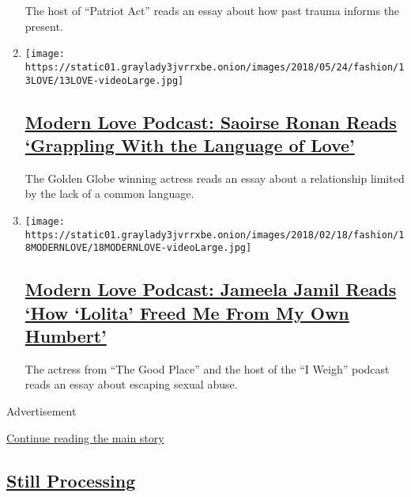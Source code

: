 \begin{enumerate}
  The host of ``Patriot Act'' reads an essay about how past trauma
  informs the present.
\item
  \texttt{[image: https://static01.graylady3jvrrxbe.onion/images/2018/05/24/fashion/13LOVE/13LOVE-videoLarge.jpg]}

  \hypertarget{modern-love-podcast-saoirse-ronan-reads-grappling-with-the-language-of-love}{%
  \subsection{\texorpdfstring{\href{/2020/05/27/style/modern-love-podcast-saoirse-ronan.html}{Modern
  Love Podcast: Saoirse Ronan Reads `Grappling With the Language of
  Love'}}{Modern Love Podcast: Saoirse Ronan Reads `Grappling With the Language of Love'}}\label{modern-love-podcast-saoirse-ronan-reads-grappling-with-the-language-of-love}}

  The Golden Globe winning actress reads an essay about a relationship
  limited by the lack of a common language.
\item
  \texttt{[image: https://static01.graylady3jvrrxbe.onion/images/2018/02/18/fashion/18MODERNLOVE/18MODERNLOVE-videoLarge.jpg]}

  \hypertarget{modern-love-podcast-jameela-jamil-reads-how-lolita-freed-me-from-my-own-humbert}{%
  \subsection{\texorpdfstring{\href{/2020/05/20/style/modern-love-podcast-jameela-jamil.html}{Modern
  Love Podcast: Jameela Jamil Reads `How `Lolita' Freed Me From My Own
  Humbert'}}{Modern Love Podcast: Jameela Jamil Reads `How `Lolita' Freed Me From My Own Humbert'}}\label{modern-love-podcast-jameela-jamil-reads-how-lolita-freed-me-from-my-own-humbert}}

  The actress from ``The Good Place'' and the host of the ``I Weigh''
  podcast reads an essay about escaping sexual abuse.
\end{enumerate}

Advertisement

\protect\hyperlink{after-mid2}{Continue reading the main story}

\hypertarget{still-processing}{%
\subsection{\texorpdfstring{\href{/column/still-processing-podcast}{Still
Processing}}{Still Processing}}\label{still-processing}}

